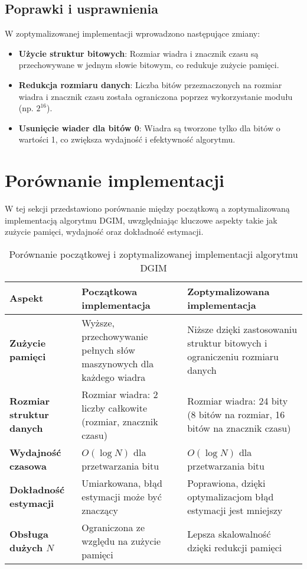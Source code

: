 \documentclass{article}
\begin{document}
\subsection{Poprawki i usprawnienia}

W zoptymalizowanej implementacji wprowadzono następujące zmiany:

\begin{itemize}
    \item \textbf{Użycie struktur bitowych}: Rozmiar wiadra i znacznik czasu są przechowywane w jednym słowie bitowym, co redukuje zużycie pamięci.
    \item \textbf{Redukcja rozmiaru danych}: Liczba bitów przeznaczonych na rozmiar wiadra i znacznik czasu została ograniczona poprzez wykorzystanie modułu (np. $2^{16}$).
    \item \textbf{Usunięcie wiader dla bitów 0}: Wiadra są tworzone tylko dla bitów o wartości 1, co zwiększa wydajność i efektywność algorytmu.
\end{itemize}

\section{Porównanie implementacji}

W tej sekcji przedstawiono porównanie między początkową a zoptymalizowaną implementacją algorytmu DGIM, uwzględniając kluczowe aspekty takie jak zużycie pamięci, wydajność oraz dokładność estymacji.

\begin{table}[H]
\centering
\begin{tabular}{@{}p{4cm}p{5cm}p{5cm}@{}}
\toprule
\textbf{Aspekt} & \textbf{Początkowa implementacja} & \textbf{Zoptymalizowana}  \textbf{implementacja} \\ \midrule
\textbf{Zużycie pamięci} & Wyższe, przechowywanie pełnych słów maszynowych dla każdego wiadra & Niższe dzięki zastosowaniu struktur bitowych i ograniczeniu rozmiaru danych \\
\textbf{Rozmiar struktur danych} & Rozmiar wiadra: 2 liczby całkowite (rozmiar, znacznik czasu) & Rozmiar wiadra: 24 bity (8 bitów na rozmiar, 16 bitów na znacznik czasu) \\
\textbf{Wydajność czasowa} & $O(\log N)$ dla przetwarzania bitu & $O(\log N)$ dla przetwarzania bitu \\
\textbf{Dokładność estymacji} & Umiarkowana, błąd estymacji może być znaczący & Poprawiona, dzięki optymalizacjom błąd estymacji jest mniejszy \\
\textbf{Obsługa dużych $N$} & Ograniczona ze względu na zużycie pamięci & Lepsza skalowalność dzięki redukcji pamięci \\
\bottomrule
\end{tabular}
\caption{Porównanie początkowej i zoptymalizowanej implementacji algorytmu DGIM}
\end{table}
\end{document}
